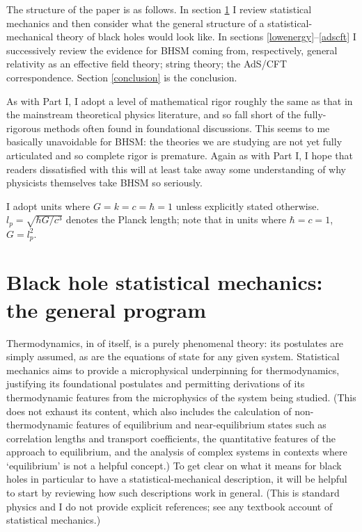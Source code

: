 \documentclass[12pt]{article}
\begin{document}
The structure of the paper is as follows. In section \ref{generalprogram} I review statistical mechanics and then consider what the general structure of a statistical-mechanical theory of black holes would look like. In sections \ref{lowenergy}--\ref{adscft} I successively review the evidence for BHSM coming from, respectively, general relativity as an effective field theory; string theory; the AdS/CFT correspondence. Section \ref{conclusion} is the conclusion.

As with Part I, I adopt a level of mathematical rigor roughly the same as that in the mainstream theoretical physics literature, and so fall short of the fully-rigorous methods often found in foundational discussions. This seems to me basically unavoidable for BHSM: the theories we are studying are not yet fully articulated and so complete rigor is premature. Again as with Part I, I hope that readers dissatisfied with this will at least take away some understanding of why physicists themselves take BHSM so seriously. 

I adopt units where $G=k=c=\hbar=1$ unless explicitly stated otherwise. $l_p=\sqrt{\hbar G/c^3}$ denotes the Planck length; note that in units where $\hbar=c=1$, $G=l_p^2$.

\section{Black hole statistical mechanics: the general program}\label{generalprogram}


Thermodynamics, in of itself, is a purely phenomenal theory: its postulates are simply assumed, as are the equations of state for any given system. Statistical mechanics aims to provide a microphysical underpinning for thermodynamics, justifying its foundational postulates and permitting derivations of its thermodynamic features from the microphysics of the system being studied. (This does not exhaust its content, which also includes the calculation of  non-thermodynamic features of equilibrium and near-equilibrium states such as correlation lengths and transport coefficients, the quantitative features of the approach to equilibrium, and the analysis of complex systems in contexts where `equilibrium' is not a helpful concept.) To get clear on what it means for black holes in particular to have a statistical-mechanical description, it will be helpful to start by reviewing how such descriptions work in general. (This is standard physics and I do not provide explicit references; see any textbook account of statistical mechanics.)
\end{document}
